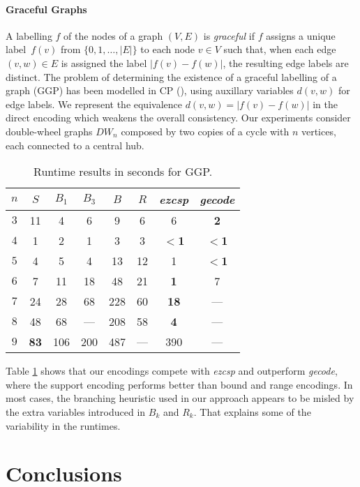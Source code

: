 \documentclass[letterpaper]{article}
\newcommand{\systemname}[1]{\textit{#1}}
\newcommand{\encsup}{$S$}
\newcommand{\encbou}{$B$}
\newcommand{\encran}{$R$}
\newcommand{\encbouh}[1]{\encbou$_{#1}$}
\newcommand{\citeap}[1]{\citeauthor{#1} (\citeyear{#1})}
\begin{document}
\paragraph{Graceful Graphs}
A labelling $f$ of the nodes of a graph $(V,E)$ is \emph{graceful} if $f$ assigns a unique label~$f(v)$ from $\{0,1,\dots,|E|\}$ to each node $v \in V$ such that, when each edge $(v,w) \in E$ is assigned the label $|f(v)-f(w)|$, the resulting edge labels are distinct. The problem of determining the existence of a graceful labelling of a graph (GGP) has been modelled in CP \citeap{pesm03a}, using auxillary variables $d(v,w)$ for edge labels. We represent the equivalence $d(v,w) = |f(v)-f(w)|$ in the direct encoding which weakens the overall consistency. Our experiments consider double-wheel graphs $DW_n$ composed by two copies of a cycle with $n$ vertices, each connected to a central hub.
\begin{table}
\centering
\begin{tabular}{cccccccc} \hline\hline
$n$ & \encsup & \encbouh{1} & \encbouh{3} & \encbou & \encran & \systemname{ezcsp} & \systemname{gecode} \\ \hline
$3$ & 11 &  4 &  6 &  9 &  6 & 6 & \textbf{2} \\
$4$ &  1 &  2 &  1 &  3 &  3 & \textbf{$<$1} & \textbf{$<$1} \\
$5$ &  4 &  5 &  4 & 13 & 12 & 1 & \textbf{$<$1} \\
$6$ &  7 & 11 & 18 & 48 & 21 & \textbf{1} & 7 \\
$7$ & 24 & 28 & 68 &228 & 60 & \textbf{18} & --- \\
$8$ & 48 & 68 & ---  &208 & 58 & \textbf{4} & --- \\
$9$ & \textbf{83} &106 &200 &487 & ---  & 390 & --- \\ \hline\hline
\end{tabular}
\caption{Runtime results in seconds for GGP. \label{tab:ggp}}
\vspace{-1\baselineskip}
\end{table}
Table \ref{tab:ggp} shows that our encodings compete with \systemname{ezcsp} and outperform \systemname{gecode}, where the support encoding performs better than bound and range encodings. In most cases, the branching heuristic used in our approach appears to be misled by the extra variables introduced in $B_k$ and $R_k$. That explains some of the variability in the runtimes.


\section{Conclusions}
\end{document}
